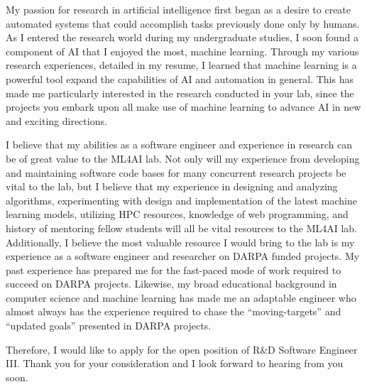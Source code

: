 My passion for research in artificial intelligence first began as a desire to create automated systems that could accomplish tasks previously done only by humans.
As I entered the research world during my undergraduate studies, I soon found a component of AI that I enjoyed the most, machine learning.
Through my various research experiences, detailed in my resume, I learned that machine learning is a powerful tool expand the capabilities of AI and automation in general.
This has made me particularly interested in the research conducted in your lab, since the projects you embark upon all make use of machine learning to advance AI in new and exciting directions.

I believe that my abilities as a software engineer and experience in research can be of great value to the ML4AI lab.
Not only will my experience from developing and maintaining software code bases for many concurrent research projects be vital to the lab, but I believe that my experience in designing and analyzing algorithms, experimenting with design and implementation of the latest machine learning models, utilizing HPC resources, knowledge of web programming, and history of mentoring fellow students will all be vital resources to the ML4AI lab.
Additionally, I believe the most valuable resource I would bring to the lab is my experience as a software engineer and researcher on DARPA funded projects.
My past experience has prepared me for the fast-paced mode of work required to succeed on DARPA projects.
Likewise, my broad educational background in computer science and machine learning has made me an adaptable engineer who almost always has the experience required to chase the “moving-targets” and “updated goals” presented in DARPA projects.

Therefore, I would like to apply for the open position of R\&D Software Engineer III.
Thank you for your consideration and I look forward to hearing from you soon.
